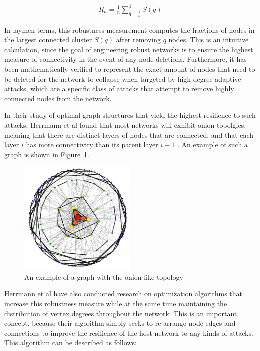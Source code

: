 \documentclass[11pt]{article}
\begin{document}
\begin{eqnarray*}
R_{n} = \frac{1}{n}\sum_{q=\frac{1}{n}}^{1}S(q)
\end{eqnarray*}

In laymen terms, this robustness measurement computes the fractions of nodes in the largest connected cluster $S(q)$ after removing $q$ nodes. This is an intuitive calculation, since the goal of engineering robust networks is to ensure the highest measure of connectivity in the event of any node deletions. Furthermore, it has been mathematically verified to represent the exact amount of nodes that need to be deleted for the network to collapse when targeted by high-degree adaptive attacks, which are a specific class of attacks that attempt to remove highly connected nodes from the network. 

In their study of optimal graph structures that yield the highest resilience to such attacks, Herrmann et al found that most networks will exhibit onion topolgies, meaning that there are distinct layers of nodes that are connected, and that each layer $i$ has more connectivity than its parent layer $i+1$ \cite{Onion}. An example of such a graph is shown in Figure~\ref{fig:Onion}.

\begin{figure}[h!]
	\label{fig:Onion}
	\centering
		\includegraphics[width=0.5\textwidth]{Onion.jpg}
	\caption{An example of a graph with the onion-like topology \cite{Onion}}
\end{figure}

Herrmann et al have also conducted research on optimization algorithms that increase this robustness measure while at the same time maintaining the distribution of vertex degrees throughout the network. This is an important concept, because their algorithm simply seeks to re-arrange node edges and connections to improve the resilience of the host network to any kinds of attacks. This algorithm can be described as follows:
\end{document}
